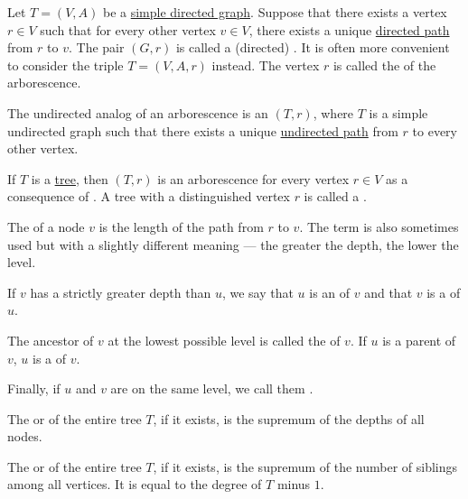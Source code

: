 \begin{definition}\label{def:arborescence}
  Let \( T = (V, A) \) be a \hyperref[def:quiver/simple]{simple directed graph}. Suppose that there exists a vertex \( r \in V \) such that for every other vertex \( v \in V \), there exists a unique \hyperref[def:quiver_path]{directed path} from \( r \) to \( v \). The pair \( (G, r) \) is called a (directed) . It is often more convenient to consider the triple \( T = (V, A, r) \) instead. The vertex \( r \) is called the  of the arborescence.

  \begin{thmenum}
     The undirected analog of an arborescence is an  \( (T, r) \), where \( T \) is a simple undirected graph such that there exists a unique \hyperref[def:undirected_multigraph_path]{undirected path} from \( r \) to every other vertex.

    If \( T \) is a \hyperref[def:tree]{tree}, then \( (T, r) \) is an arborescence for every vertex \( r \in V \) as a consequence of . A tree with a distinguished vertex \( r \) is called a .

     The  of a node \( v \) is the length of the path from \( r \) to \( v \). The term  is also sometimes used but with a slightly different meaning --- the greater the depth, the lower the level.

     If \( v \) has a strictly greater depth than \( u \), we say that \( u \) is an  of \( v \) and that \( v \) is a  of \( u \).

    The ancestor of \( v \) at the lowest possible level is called the  of \( v \). If \( u \) is a parent of \( v \), \( u \) is a  of \( v \).

    Finally, if \( u \) and \( v \) are on the same level, we call them .

     The  or  of the entire tree \( T \), if it exists, is the supremum of the depths of all nodes.

     The  or  of the entire tree \( T \), if it exists, is the supremum of the number of siblings among all vertices. It is equal to the degree of \( T \) minus \( 1 \).


\end{thmenum}
\end{definition}
